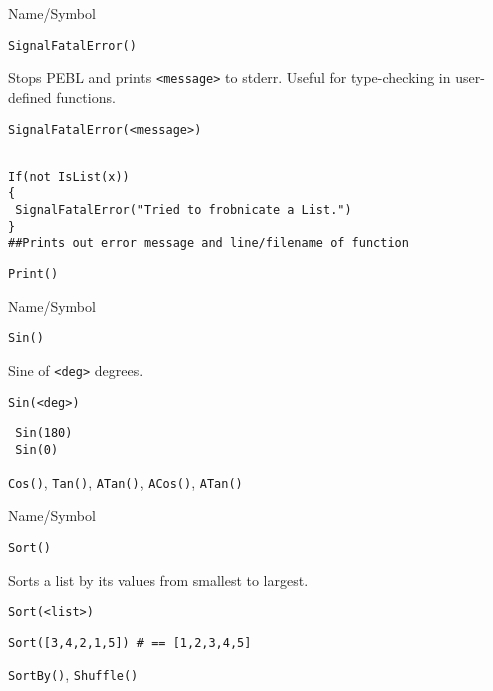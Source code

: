 \rl


\begin{desc}{Name/Symbol}
\item[Name/Symbol] 	\verb+SignalFatalError()+

\item[Description] Stops PEBL and prints \verb+<message>+ to stderr.
  Useful for type-checking in user-defined functions.

\item[Usage]
\begin{verbatim}
SignalFatalError(<message>)
\end{verbatim}
\item[Example]
\begin{verbatim}

If(not IsList(x))
{
 SignalFatalError("Tried to frobnicate a List.")
}
##Prints out error message and line/filename of function
\end{verbatim}

\item[See Also]     	\verb+Print()+
\end{desc}

\rl


\begin{desc}{Name/Symbol}
\item[Name/Symbol]  	\verb+Sin()+

\item[Description]  	Sine of \verb+<deg>+ degrees.

\item[Usage]        	
\begin{verbatim}
Sin(<deg>)
\end{verbatim}
\item[Example]
\begin{verbatim}
 Sin(180)
 Sin(0)
\end{verbatim}
\item[See Also]    	\verb+Cos()+, \verb+Tan()+, \verb+ATan()+, \verb+ACos()+, \verb+ATan()+ 
\end{desc}

\rl


\begin{desc}{Name/Symbol}
\item[Name/Symbol] 	\verb+Sort()+

\item[Description] 	Sorts a list by its values from smallest to largest.

\item[Usage]       	
\begin{verbatim}
Sort(<list>)
\end{verbatim}

\item[Example]
\begin{verbatim}
Sort([3,4,2,1,5]) # == [1,2,3,4,5]
\end{verbatim}

\item[See Also]    	\verb+SortBy()+, \verb+Shuffle()+
\end{desc}

